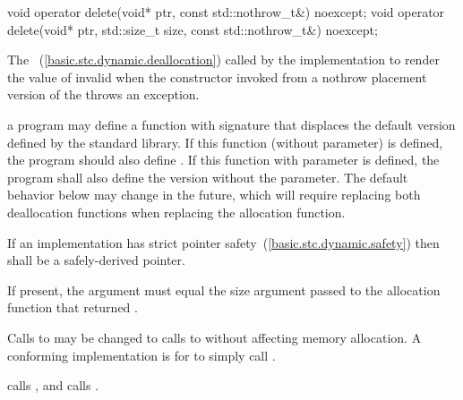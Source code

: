 %
\begin{itemdecl}
void operator delete(void* ptr, const std::nothrow_t&) noexcept;
void operator delete(void* ptr, std::size_t size, const std::nothrow_t&) noexcept;
\end{itemdecl}

\begin{itemdescr}
\pnum
\effects
The
~(\ref{basic.stc.dynamic.deallocation})
called by the implementation
to render the value of  invalid
when the constructor invoked from a nothrow
placement version of the  throws an exception.

\pnum
\replaceable
a \Cpp program may define a function with signature
that displaces the default version defined by the
\Cpp standard library. If this function (without  parameter) is defined,
the program should also define
.
If this function with  parameter is defined, the program shall also define the
version without the  parameter. \enternote The default behavior below may change
in the future, which will require replacing both deallocation functions when replacing the
allocation function. \exitnote

\pnum
\requires
If an implementation has strict pointer safety~(\ref{basic.stc.dynamic.safety})
then  shall be a safely-derived pointer.

\pnum
\requires If present, the  argument must equal the size
argument passed to the allocation function that returned .

\pnum
\required Calls to
 may be
changed to calls to  without
affecting memory allocation.
\enternote A conforming implementation is for
 to simply
call . \exitnote

\pnum
{}
{}
calls , and
 calls
.
\end{itemdescr}

